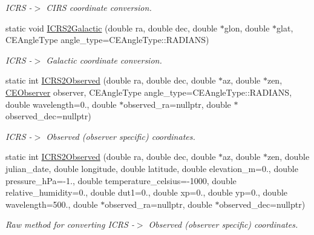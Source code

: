 \begin{DoxyCompactItemize}
\begin{DoxyCompactList}\small\item\em I\+C\+R\+S -\/$>$ C\+I\+R\+S coordinate conversion. \end{DoxyCompactList}\item 
static void \hyperlink{class_c_e_coordinates_afaea845380366fb186f744457e42cd50}{I\+C\+R\+S2\+Galactic} (double ra, double dec, double $\ast$glon, double $\ast$glat, C\+E\+Angle\+Type angle\+\_\+type=C\+E\+Angle\+Type\+::\+R\+A\+D\+I\+A\+N\+S)
\begin{DoxyCompactList}\small\item\em I\+C\+R\+S -\/$>$ Galactic coordinate conversion. \end{DoxyCompactList}\item 
static int \hyperlink{class_c_e_coordinates_a2c71eeacb95897d5ef1b59312565a7c6}{I\+C\+R\+S2\+Observed} (double ra, double dec, double $\ast$az, double $\ast$zen, \hyperlink{class_c_e_observer}{C\+E\+Observer} observer, C\+E\+Angle\+Type angle\+\_\+type=C\+E\+Angle\+Type\+::\+R\+A\+D\+I\+A\+N\+S, double wavelength=0., double $\ast$observed\+\_\+ra=nullptr, double $\ast$observed\+\_\+dec=nullptr)
\begin{DoxyCompactList}\small\item\em I\+C\+R\+S -\/$>$ Observed (observer specific) coordinates. \end{DoxyCompactList}\item 
static int \hyperlink{class_c_e_coordinates_a336c5a3251f88c3f62b2d9c3d964a8c6}{I\+C\+R\+S2\+Observed} (double ra, double dec, double $\ast$az, double $\ast$zen, double julian\+\_\+date, double longitude, double latitude, double elevation\+\_\+m=0., double pressure\+\_\+h\+Pa=-\/1., double temperature\+\_\+celsius=-\/1000, double relative\+\_\+humidity=0., double dut1=0., double xp=0., double yp=0., double wavelength=500., double $\ast$observed\+\_\+ra=nullptr, double $\ast$observed\+\_\+dec=nullptr)
\begin{DoxyCompactList}\small\item\em Raw method for converting I\+C\+R\+S -\/$>$ Observed (observer specific) coordinates. \end{DoxyCompactList}\end{DoxyCompactItemize}

